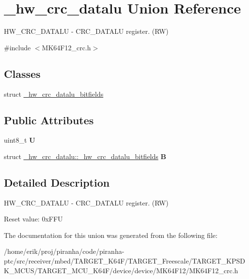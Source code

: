 \hypertarget{union__hw__crc__datalu}{}\section{\+\_\+hw\+\_\+crc\+\_\+datalu Union Reference}
\label{union__hw__crc__datalu}


H\+W\+\_\+\+C\+R\+C\+\_\+\+D\+A\+T\+A\+LU -\/ C\+R\+C\+\_\+\+D\+A\+T\+A\+LU register. (RW)  




{\ttfamily \#include $<$M\+K64\+F12\+\_\+crc.\+h$>$}

\subsection*{Classes}
\begin{DoxyCompactItemize}
\item 
struct \hyperlink{struct__hw__crc__datalu_1_1__hw__crc__datalu__bitfields}{\+\_\+hw\+\_\+crc\+\_\+datalu\+\_\+bitfields}
\end{DoxyCompactItemize}
\subsection*{Public Attributes}
\begin{DoxyCompactItemize}
\item 
uint8\+\_\+t {\bfseries U}\hypertarget{union__hw__crc__datalu_ad545fca2632d12c2a9628a10ecb23247}{}\label{union__hw__crc__datalu_ad545fca2632d12c2a9628a10ecb23247}

\item 
struct \hyperlink{struct__hw__crc__datalu_1_1__hw__crc__datalu__bitfields}{\+\_\+hw\+\_\+crc\+\_\+datalu\+::\+\_\+hw\+\_\+crc\+\_\+datalu\+\_\+bitfields} {\bfseries B}\hypertarget{union__hw__crc__datalu_a4595375e0c4a6a3c78cce6a20075c4b2}{}\label{union__hw__crc__datalu_a4595375e0c4a6a3c78cce6a20075c4b2}

\end{DoxyCompactItemize}


\subsection{Detailed Description}
H\+W\+\_\+\+C\+R\+C\+\_\+\+D\+A\+T\+A\+LU -\/ C\+R\+C\+\_\+\+D\+A\+T\+A\+LU register. (RW) 

Reset value\+: 0x\+F\+FU 

The documentation for this union was generated from the following file\+:\begin{DoxyCompactItemize}
\item 
/home/erik/proj/piranha/code/piranha-\/ptc/src/receiver/mbed/\+T\+A\+R\+G\+E\+T\+\_\+\+K64\+F/\+T\+A\+R\+G\+E\+T\+\_\+\+Freescale/\+T\+A\+R\+G\+E\+T\+\_\+\+K\+P\+S\+D\+K\+\_\+\+M\+C\+U\+S/\+T\+A\+R\+G\+E\+T\+\_\+\+M\+C\+U\+\_\+\+K64\+F/device/device/\+M\+K64\+F12/M\+K64\+F12\+\_\+crc.\+h\end{DoxyCompactItemize}
